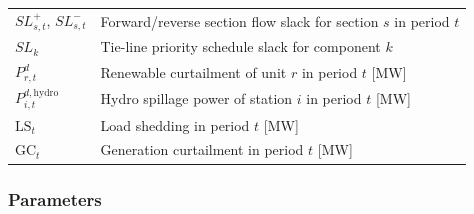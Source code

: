 \begin{longtable}{lL{10.5cm}}
$SL^{+}_{s,t}$, $SL^{-}_{s,t}$ & Forward/reverse section flow slack for section $s$ in period $t$ \\
$SL_k$              & Tie-line priority schedule slack for component $k$ \\
$P^{d}_{r,t}$       & Renewable curtailment of unit $r$ in period $t$ [MW] \\
$P^{d,\mathrm{hydro}}_{i,t}$ & Hydro spillage power of station $i$ in period $t$ [MW] \\
$\mathrm{LS}_t$     & Load shedding in period $t$ [MW] \\
$\mathrm{GC}_t$     & Generation curtailment in period $t$ [MW] \\
\bottomrule
\end{longtable}

\subsubsection{Parameters}

